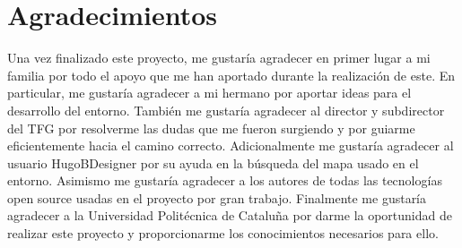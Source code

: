 \chapter{Agradecimientos}

Una vez finalizado este proyecto, me gustaría agradecer en primer lugar a mi familia por todo el apoyo que me han aportado durante la realización de este. En particular, me gustaría agradecer a mi hermano por aportar ideas para el desarrollo del entorno. También me gustaría agradecer al director y subdirector del TFG por resolverme las dudas que me fueron surgiendo y por guiarme eficientemente hacia el camino correcto. Adicionalmente me gustaría agradecer al usuario HugoBDesigner por su ayuda en la búsqueda del mapa usado en el entorno. Asimismo me gustaría agradecer a los autores de todas las tecnologías open source usadas en el proyecto por gran trabajo. Finalmente me gustaría agradecer a la Universidad Politécnica de Cataluña por darme la oportunidad de realizar este proyecto y proporcionarme los conocimientos necesarios para ello.
